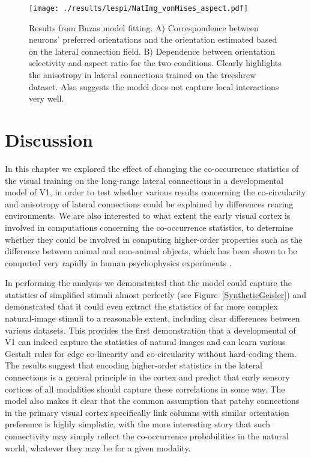 \begin{figure}
	\centering
        \texttt{[image: ./results/lespi/NatImg\_vonMises\_aspect.pdf]}
	\caption[Results from Buzas model fitting.]{Results from Buzas
      model fitting. A) Correspondence between neurons' preferred
      orientations and the orientation estimated based on the lateral
      connection field. B) Dependence between orientation selectivity
      and aspect ratio for the two conditions. Clearly highlights the
      anisotropy in lateral connections trained on the treeshrew
      dataset. Also suggests the model does not capture local
      interactions very well.}
	\label{NatImgvonMisesAspect}
\end{figure}

\section{Discussion}

In this chapter we explored the effect of changing the co-occurrence
statistics of the visual training on the long-range lateral
connections in a developmental model of V1, in order to test whether
various results concerning the co-circularity \citep{Hunt2011} and
anisotropy of lateral connections \citep{Bosking1997} could be
explained by differences rearing environments. We are also interested
to what extent the early visual cortex is involved in computations
concerning the co-occurrence statistics, to determine whether they
could be involved in computing higher-order properties such as the
difference between animal and non-animal objects, which has been shown
to be computed very rapidly in human psychophysics experiments
\citep{Serre2007b}.

In performing the analysis we demonstrated that the model could
capture the statistics of simplified stimuli almost perfectly (see
Figure~\ref{SyntheticGeisler}) and demonstrated that it could even
extract the statistics of far more complex natural-image stimuli to a
reasonable extent, including clear differences between various
datasets. This provides the first demonstration that a developmental
of V1 can indeed capture the statistics of natural images and can
learn various Gestalt rules for edge co-linearity and co-circularity
without hard-coding them. The results suggest that encoding
higher-order statistics in the lateral connections is a general
principle in the cortex and predict that early sensory cortices of all
modalities should capture these correlations in some way. The model
also makes it clear that the common assumption that patchy connections
in the primary visual cortex specifically link columns with similar
orientation preference is highly simplistic, with the more interesting
story that such connectivity may simply reflect the co-occurrence
probabilities in the natural world, whatever they may be for a given
modality.

